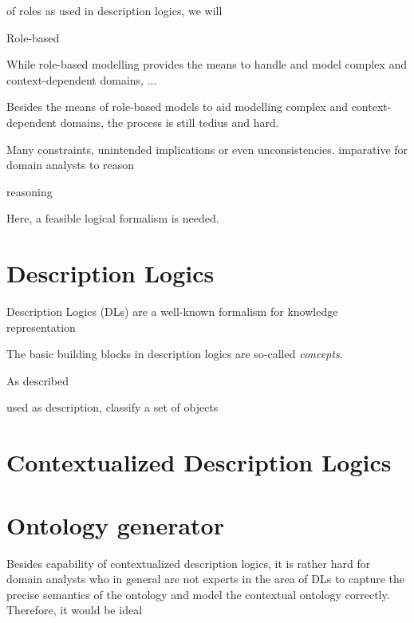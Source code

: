  of roles as used in description logics, we will 


Role-based


While role-based modelling provides the means to handle and model complex and context-dependent
domains, ...

Besides the means of role-based models to aid modelling complex and context-dependent
domains, the process is still tedius and hard. 

Many constraints, unintended implications or even unconsistencies. imparative for domain analysts to reason

reasoning

Here, a feasible logical formalism is needed.

\section{Description Logics}
\label{sec:intro-description-logics}

Description Logics (DLs) are a well-known formalism for knowledge representation



The basic building blocks in description logics are so-called \emph{concepts}. 

As described

used as description, classify a set of objects

\section{Contextualized Description Logics}
\label{sec:intro-contextualized-description-logics}


\blindtext

\section{Ontology generator}
\label{sec:zweite-section}

Besides capability of contextualized description logics, it is rather hard for domain analysts who
in general are not experts in the area of DLs to capture the precise semantics of the ontology and model the
contextual ontology correctly. Therefore, it would be ideal 

